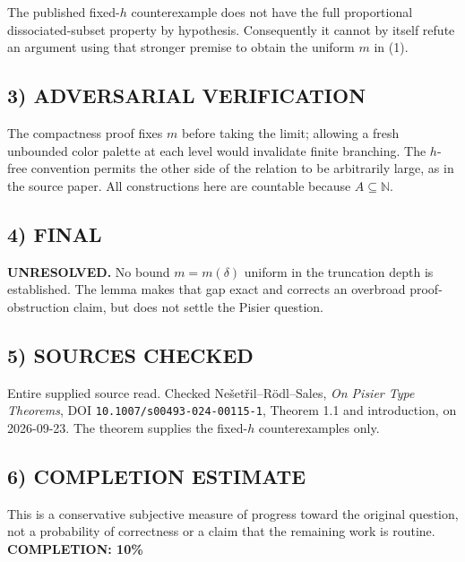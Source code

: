 The published fixed-$h$ counterexample does not have the full proportional dissociated-subset property by hypothesis. Consequently it cannot by itself refute an argument using that stronger premise to obtain the uniform $m$ in (1).
\subsection{3) ADVERSARIAL VERIFICATION}
The compactness proof fixes $m$ before taking the limit; allowing a fresh unbounded color palette at each level would invalidate finite branching. The $h$-free convention permits the other side of the relation to be arbitrarily large, as in the source paper. All constructions here are countable because $A\subseteq\mathbb N$.
\subsection{4) FINAL}
\textbf{UNRESOLVED.}
No bound $m=m(\delta)$ uniform in the truncation depth is established. The lemma makes that gap exact and corrects an overbroad proof-obstruction claim, but does not settle the Pisier question.
\subsection{5) SOURCES CHECKED}
Entire supplied source read. Checked Ne\v{s}et\v{r}il--R\"odl--Sales, \emph{On Pisier Type Theorems}, DOI \texttt{10.1007/s00493-024-00115-1}, Theorem 1.1 and introduction, on 2026-09-23. The theorem supplies the fixed-$h$ counterexamples only.
\subsection{6) COMPLETION ESTIMATE}
This is a conservative subjective measure of progress toward the original question, not a probability of correctness or a claim that the remaining work is routine.
\textbf{COMPLETION: 10\%}
